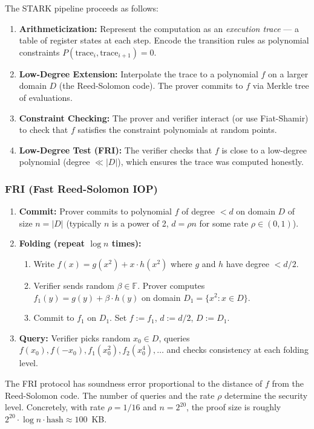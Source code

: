 The STARK pipeline proceeds as follows:
\begin{enumerate}
\item \textbf{Arithmeticization:} Represent the computation as an \emph{execution trace} --- a table of register states at each step. Encode the transition rules as polynomial constraints $P(\text{trace}_i, \text{trace}_{i+1}) = 0$.
\item \textbf{Low-Degree Extension:} Interpolate the trace to a polynomial $f$ on a larger domain $D$ (the Reed-Solomon code). The prover commits to $f$ via Merkle tree of evaluations.
\item \textbf{Constraint Checking:} The prover and verifier interact (or use Fiat-Shamir) to check that $f$ satisfies the constraint polynomials at random points.
\item \textbf{Low-Degree Test (FRI):} The verifier checks that $f$ is close to a low-degree polynomial (degree $\ll |D|$), which ensures the trace was computed honestly.
\end{enumerate}

\subsubsection*{FRI (Fast Reed-Solomon IOP)}
\label{sec:zk:fri}

\begin{enumerate}
\item \textbf{Commit:} Prover commits to polynomial $f$ of degree $< d$ on domain $D$ of size $n = |D|$ (typically $n$ is a power of 2, $d = \rho n$ for some rate $\rho \in (0,1)$).
\item \textbf{Folding (repeat $\log n$ times):}
  \begin{enumerate}
  \item Write $f(x) = g(x^2) + x \cdot h(x^2)$ where $g$ and $h$ have degree $< d/2$. 
  \item Verifier sends random $\beta \in \mathbb{F}$. Prover computes $f_1(y) = g(y) + \beta \cdot h(y)$ on domain $D_1 = \{x^2 : x \in D\}$.
  \item Commit to $f_1$ on $D_1$. Set $f := f_1$, $d := d/2$, $D := D_1$.
  \end{enumerate}
\item \textbf{Query:} Verifier picks random $x_0 \in D$, queries $f(x_0), f(-x_0), f_1(x_0^2), f_2(x_0^4), \dots$ and checks consistency at each folding level.
\end{enumerate}

The FRI protocol has soundness error proportional to the distance of $f$ from the Reed-Solomon code. The number of queries and the rate $\rho$ determine the security level. Concretely, with rate $\rho = 1/16$ and $n=2^{20}$, the proof size is roughly $2^{20} \cdot \log n \cdot \text{hash} \approx 100$~KB.

